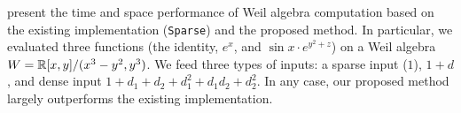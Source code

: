 \documentclass[rims-smooth-paper.tex]{subfiles}
\begin{document}
 present the time and space performance of Weil algebra computation based on the existing implementation (\texttt{Sparse}) and the proposed method.
In particular, we evaluated three functions (the identity, $e^x$, and $\sin x \cdot e^{y^2 + z}$) on a Weil algebra $W = \mathbb{R}[x,y]/(x^3 - y^2, y^3)$.
We feed three types of inputs: a sparse input ($1$), $1 + d$, and dense input $1 + d_1 + d_2 + d_1^2 + d_1 d_2 + d_2^2$.
In any case, our proposed method largely outperforms the existing implementation.
\end{document}
